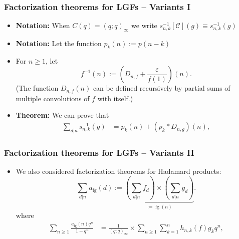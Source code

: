 \begin{frame}
\frametitle{Factorization theorems for LGFs -- Variants I}
\begin{itemize} 

\item \textbf{Notation:} When $C(q) = (q; q)_{\infty}$ we write $s_{n,k}^{-1}[\mathcal{C}](g) \equiv s_{n,k}^{-1}(g)$ 
\pause\item \textbf{Notation:} Let the function $p_k(n) := p(n-k)$ 
\pause\item For $n \geq 1$, let 
      $$f^{-1}(n) := \left(D_{n,f} + \frac{\varepsilon}{f(1)}\right)(n).$$ 
      (The function $D_{n,f}(n)$ can be defined recursively by partial sums of multiple convolutions of $f$ with itself.) 
\pause\item \textbf{Theorem:} We can prove that 
      \begin{align*} 
      \sum_{d|n} s_{n,k}^{-1}(g) & = p_k(n) + (p_k \ast D_{n,g})(n), 
      \end{align*}

\end{itemize}

\end{frame}

\begin{frame}
\frametitle{Factorization theorems for LGFs -- Variants II}
\begin{itemize} 

\item We also considered factorization theorems for Hadamard products:
      \[
      \sum_{d|n} a_{\operatorname{fg}}(d) := 
           \underset{:=\operatorname{fg}(n)}{\underbrace{\left(\sum_{d|n} f_d\right) \times \left(\sum_{d|n} g_d\right)}}. 
      \]
      where 
      \begin{align*} 
      \sum_{n \geq 1} \frac{a_{\operatorname{fg}}(n) q^n}{1-q^n} & = \frac{1}{(q; q)_{\infty}} \times \sum_{n \geq 1} 
           \sum_{k=1}^n h_{n,k}(f) g_k q^n, 
      \end{align*}

\end{itemize}

\end{frame}

